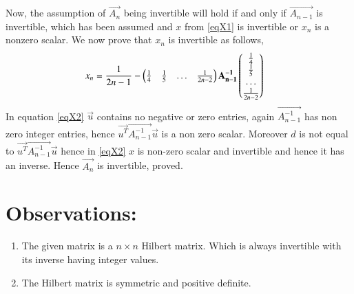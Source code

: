 \documentclass[journal,12pt,twocolumn]{IEEEtran}
\begin{document}
Now, the assumption of $\vec{A_n}$ being invertible will hold if and only if $\vec{A_{n-1}}$ is invertible, which has been assumed and $x$ from \eqref{eqX1} is invertible or $x_n$ is a nonzero scalar. We now prove that $x_n$ is invertible as follows,
\begin{align}
x_n &= \frac{1}{2n-1}-\begin{pmatrix}\frac{1}{4}&\frac{1}{5}&\dots&\frac{1}{2n-2}\end{pmatrix}\mathbf{A_{n-1}^{-1}}\begin{pmatrix}\frac{1}{4}\\\frac{1}{5}\\\dots\\\frac{1}{2n-2}\end{pmatrix} \label{eqX2}
\end{align}
In equation \eqref{eqX2} $\vec{u}$ contains no negative or zero entries, again $\vec{A_{n-1}^{-1}}$ has non zero integer entries, hence $\vec{u^T}\vec{A_{n-1}^{-1}}\vec{u}$ is a non zero scalar. Moreover $d$ is not equal to $\vec{u^T}\vec{A_{n-1}^{-1}}\vec{u}$ hence in \eqref{eqX2} $x$ is non-zero scalar and invertible and hence it has an inverse. Hence $\vec{A_n}$ is invertible, proved.

\section{\textbf{Observations:}} 
\begin{enumerate}
    \item The given matrix is a $n\times n$ Hilbert matrix. Which is always invertible with its inverse having integer values.
    \item The Hilbert matrix is symmetric and positive definite.
\end{enumerate}
 
\end{document}
